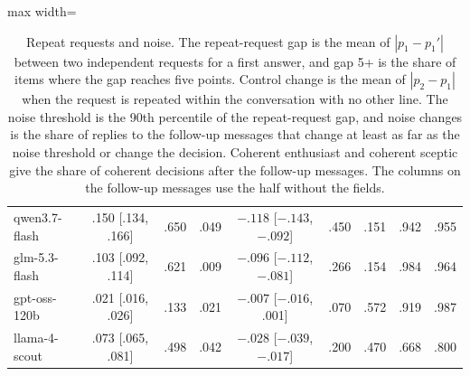 \begin{table}[t]
\begin{adjustbox}{max width=\linewidth}
\begin{tabular}{lcccccccc}
qwen3.7-flash & .150 [.134, .166] & .650 & .049 & $-.118$ [$-.143$, $-.092$] & .450 & .151 & .942 & .955 \\
glm-5.3-flash & .103 [.092, .114] & .621 & .009 & $-.096$ [$-.112$, $-.081$] & .266 & .154 & .984 & .964 \\
gpt-oss-120b & .021 [.016, .026] & .133 & .021 & $-.007$ [$-.016$, .001] & .070 & .572 & .919 & .987 \\
llama-4-scout & .073 [.065, .081] & .498 & .042 & $-.028$ [$-.039$, $-.017$] & .200 & .470 & .668 & .800 \\
\bottomrule
\end{tabular}
\end{adjustbox}
\caption{Repeat requests and noise. The repeat-request gap is the mean of $|p_1-p_1'|$ between two independent requests for a first answer, and gap 5+ is the share of items where the gap reaches five points. Control change is the mean of $|p_2-p_1|$ when the request is repeated within the conversation with no other line. The noise threshold is the 90th percentile of the repeat-request gap, and noise changes is the share of replies to the follow-up messages that change at least as far as the noise threshold or change the decision. Coherent enthusiast and coherent sceptic give the share of coherent decisions after the follow-up messages. The columns on the follow-up messages use the half without the fields.}
\label{tab:reask}
\end{table}
